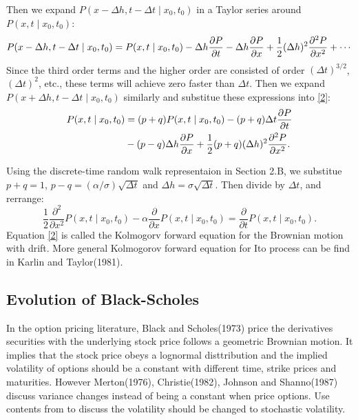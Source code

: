 \documentclass{article}
\numberwithin{equation}{section}
\begin{document}
Then we expand $P( x-\Delta h,t-\Delta t \mid x_0,t_0)$ in a Taylor series around $P(x,t \mid x_0,t_0)$:
\begin{equation}\notag
    P(x-\Delta h, t-\Delta t \mid x_0,t_0)=P(x,t\mid x_0,t_0)-\Delta h \frac{\partial P}{\partial t} - \Delta h \frac{\partial P}{\partial x}+ \frac{1}{2}(\Delta h)^2
    \frac{\partial^2 P}{\partial x^2} + \cdots
\end{equation}
Since the third order terms and the higher order are consisted of order $(\Delta t)^{3/2}$, $(\Delta t)^2$, etc., these terms will achieve zero faster
than $\Delta t$. Then we expand $P(x+\Delta h, t-\Delta t \mid x_0, t_0)$ similarly and substitue these expressions into \eqref{2}:
\begin{align}\notag
    P(x,t\mid x_0, t_0)&=(p+q)P(x,t\mid x_0,t_0)-(p+q)\Delta t \frac{\partial P}{\partial t}\\
                       &-(p-q)\Delta h \frac{\partial P}{\partial x}+\frac{1}{2}(p+q)(\Delta h)^2 \frac{\partial^2 P}{\partial x^2}.
\end{align}

Using the discrete-time random walk representaion in Section 2.B, we substitue $p+q=1$, $p-q = (\alpha / \sigma)\sqrt{\Delta t}$ and $\Delta h = \sigma \sqrt{\Delta t} $. Then divide
by $\Delta t$, and rerrange:
\begin{equation}\label{2}
    \frac{1}{2}\frac{\partial^2}{\partial x^2} P(x,t \mid x_0, t_0) - \alpha \frac{\partial}{\partial x}P(x,t \mid x_0, t_0)= \frac{\partial}{\partial t}P(x,t \mid x_0,t_0).
\end{equation}
Equation \eqref{2} is called the Kolmogorv forward equation for the Brownian motion with drift. More general Kolmogorov forward equation for Ito process can be find in Karlin and Taylor(1981).

\subsection*{Evolution of Black-Scholes}
In the option pricing literature, Black and Scholes(1973)\cite{Black_1973} price the derivatives securities with the underlying stock price follows a 
geometric Brownian motion. It implies that the stock price obeys a lognormal disttribution and the implied volatility of 
options should be a constant with different time, strike prices and maturities. However Merton(1976)\cite{Merton_1976}, Christie(1982)\cite{Christie_1982}, Johnson and Shanno(1987)
\cite{Christie_1982} discuss variance changes instead of being a constant when price options. Use contents from \cite{AtSahalia2007} 
\cite{Christie_1982} \cite{Johnson_1987} to discuss the volatility should be changed to stochastic volatility.
\end{document}
